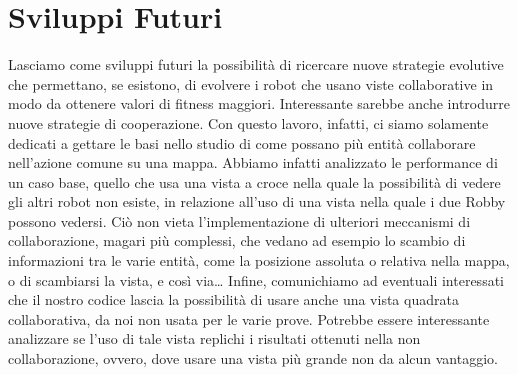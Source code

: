 \section{Sviluppi Futuri}
Lasciamo come sviluppi futuri la possibilità di ricercare nuove strategie
evolutive che permettano, se esistono, di evolvere i robot che usano viste
collaborative in modo da ottenere valori di fitness maggiori.\newline
Interessante sarebbe anche introdurre nuove strategie di cooperazione. Con
questo lavoro, infatti, ci siamo solamente dedicati a gettare le basi nello
studio di come possano più entità collaborare nell'azione comune su una mappa.
Abbiamo infatti analizzato le performance di un caso base, quello che usa una
vista a croce nella quale la possibilità di vedere gli altri robot non esiste,
in relazione all'uso di una vista nella quale i due Robby possono vedersi. Ciò
non vieta l'implementazione di ulteriori meccanismi di collaborazione, magari
più complessi, che vedano ad esempio lo scambio di informazioni tra le varie
entità, come la posizione assoluta o relativa nella mappa, o di scambiarsi la
vista, e così via\dots\newline
Infine, comunichiamo ad eventuali interessati che il nostro codice lascia la
possibilità di usare anche una vista quadrata collaborativa, da noi non usata
per le varie prove. Potrebbe essere interessante analizzare se l'uso di tale
vista replichi i risultati ottenuti nella non collaborazione, ovvero, dove usare
una vista più grande non da alcun vantaggio.
